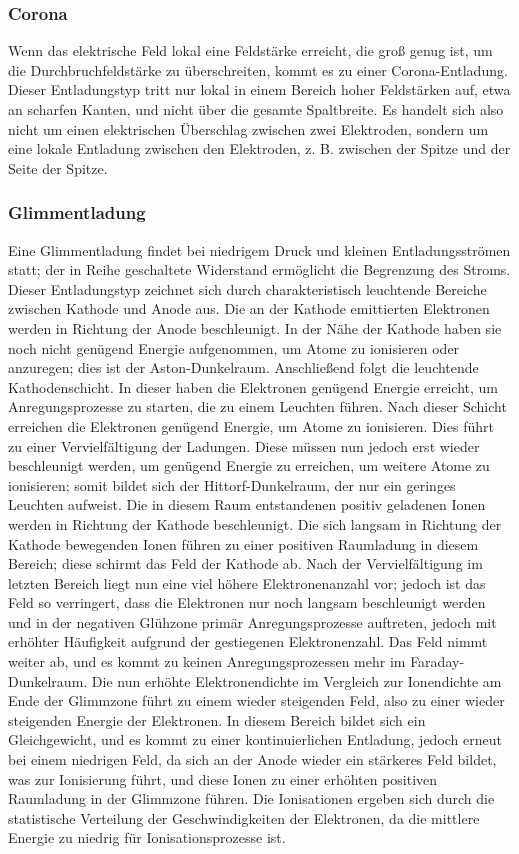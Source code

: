 \subsubsection{Corona}
Wenn das elektrische Feld lokal eine Feldstärke erreicht, die groß genug ist, um die Durchbruchfeldstärke zu überschreiten, kommt es zu einer Corona-Entladung. Dieser Entladungstyp tritt nur lokal in einem Bereich hoher Feldstärken auf, etwa an scharfen Kanten, und nicht über die gesamte Spaltbreite. Es handelt sich also nicht um einen elektrischen Überschlag zwischen zwei Elektroden, sondern um eine lokale Entladung zwischen den Elektroden, z. B. zwischen der Spitze und der Seite der Spitze.
\subsubsection{Glimmentladung}
Eine Glimmentladung findet bei niedrigem Druck und kleinen Entladungsströmen statt; der in Reihe geschaltete Widerstand ermöglicht die Begrenzung des Stroms.
Dieser Entladungstyp zeichnet sich durch charakteristisch leuchtende Bereiche zwischen Kathode und Anode aus. Die an der Kathode emittierten Elektronen werden in Richtung der Anode beschleunigt. In der Nähe der Kathode haben sie noch nicht genügend Energie aufgenommen, um Atome zu ionisieren oder anzuregen; dies ist der Aston-Dunkelraum. Anschließend folgt die leuchtende Kathodenschicht. In dieser haben die Elektronen genügend Energie erreicht, um Anregungsprozesse zu starten, die zu einem Leuchten führen. Nach dieser Schicht erreichen die Elektronen genügend Energie, um Atome zu ionisieren. Dies führt zu einer Vervielfältigung der Ladungen. Diese müssen nun jedoch erst wieder beschleunigt werden, um genügend Energie zu erreichen, um weitere Atome zu ionisieren; somit bildet sich der Hittorf-Dunkelraum, der nur ein geringes Leuchten aufweist. Die in diesem Raum entstandenen positiv geladenen Ionen werden in Richtung der Kathode beschleunigt. Die sich langsam in Richtung der Kathode bewegenden Ionen führen zu einer positiven Raumladung in diesem Bereich; diese schirmt das Feld der Kathode ab. Nach der Vervielfältigung im letzten Bereich liegt nun eine viel höhere Elektronenanzahl vor; jedoch ist das Feld so verringert, dass die Elektronen nur noch langsam beschleunigt werden und in der negativen Glühzone primär Anregungsprozesse auftreten, jedoch mit erhöhter Häufigkeit aufgrund der gestiegenen Elektronenzahl. Das Feld nimmt weiter ab, und es kommt zu keinen Anregungsprozessen mehr im Faraday-Dunkelraum. Die nun erhöhte Elektronendichte im Vergleich zur Ionendichte am Ende der Glimmzone führt zu einem wieder steigenden Feld, also zu einer wieder steigenden Energie der Elektronen. In diesem Bereich bildet sich ein Gleichgewicht, und es kommt zu einer kontinuierlichen Entladung, jedoch erneut bei einem niedrigen Feld, da sich an der Anode wieder ein stärkeres Feld bildet, was zur Ionisierung führt, und diese Ionen zu einer erhöhten positiven Raumladung in der Glimmzone führen. Die Ionisationen ergeben sich durch die statistische Verteilung der Geschwindigkeiten der Elektronen, da die mittlere Energie zu niedrig für Ionisationsprozesse ist. \cite{stroth2018}

